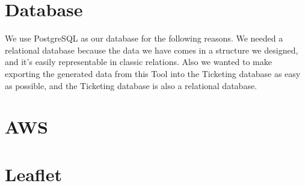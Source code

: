 \section{Database}
We use PostgreSQL as our database for the following reasons. We needed a relational database because the data we have comes in a structure we designed, and it's easily representable in classic relations. Also we wanted to make exporting the generated data from this Tool into the Ticketing database as easy as possible, and the Ticketing database is also a relational database. 


\section{AWS}

\section{Leaflet}
